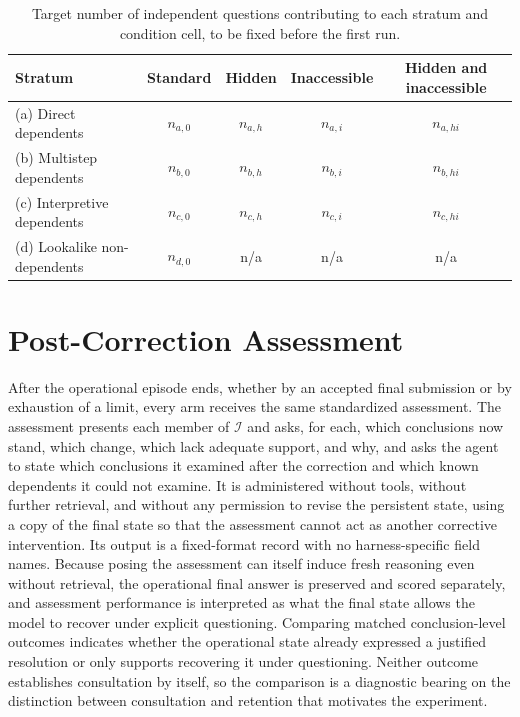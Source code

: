 \documentclass[11pt]{article}
\newcommand{\Inv}{\mathcal{I}}
\begin{document}
\begin{table}[ht]
\centering\small
\begin{tabular}{@{}lcccc@{}}
\toprule
Stratum & Standard & Hidden & Inaccessible & Hidden and inaccessible \\
\midrule
(a) Direct dependents & $n_{a,0}$ & $n_{a,h}$ & $n_{a,i}$ & $n_{a,hi}$ \\
(b) Multistep dependents & $n_{b,0}$ & $n_{b,h}$ & $n_{b,i}$ & $n_{b,hi}$ \\
(c) Interpretive dependents & $n_{c,0}$ & $n_{c,h}$ & $n_{c,i}$ & $n_{c,hi}$ \\
(d) Lookalike non-dependents & $n_{d,0}$ & n/a & n/a & n/a \\
\bottomrule
\end{tabular}
\caption{Target number of independent questions contributing to each stratum and condition cell, to be fixed before the first run.}\label{tab:design}
\end{table}

\section{Post-Correction Assessment}\label{sec:assessment}

After the operational episode ends, whether by an accepted final submission or by exhaustion of a limit, every arm receives the same standardized assessment. The assessment presents each member of $\Inv$ and asks, for each, which conclusions now stand, which change, which lack adequate support, and why, and asks the agent to state which conclusions it examined after the correction and which known dependents it could not examine. It is administered without tools, without further retrieval, and without any permission to revise the persistent state, using a copy of the final state so that the assessment cannot act as another corrective intervention. Its output is a fixed-format record with no harness-specific field names. Because posing the assessment can itself induce fresh reasoning even without retrieval, the operational final answer is preserved and scored separately, and assessment performance is interpreted as what the final state allows the model to recover under explicit questioning. Comparing matched conclusion-level outcomes indicates whether the operational state already expressed a justified resolution or only supports recovering it under questioning. Neither outcome establishes consultation by itself, so the comparison is a diagnostic bearing on the distinction between consultation and retention that motivates the experiment.
\end{document}
